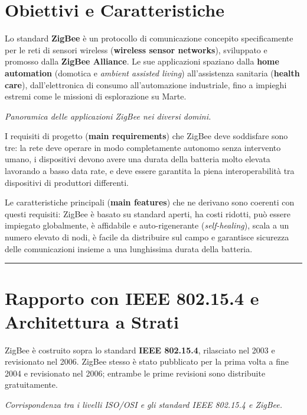 \documentclass[
  italian,
  openany]{book}
\begin{document}
\section{Obiettivi e Caratteristiche}\label{obiettivi-e-caratteristiche}

Lo standard \textbf{ZigBee} è un protocollo di comunicazione concepito
specificamente per le reti di sensori wireless (\textbf{wireless sensor
networks}), sviluppato e promosso dalla \textbf{ZigBee Alliance}. Le sue
applicazioni spaziano dalla \textbf{home automation} (domotica e
\emph{ambient assisted living}) all'assistenza sanitaria (\textbf{health
care}), dall'elettronica di consumo all'automazione industriale, fino a
impieghi estremi come le missioni di esplorazione su Marte.

\emph{Panoramica delle applicazioni ZigBee nei diversi domini.}

I requisiti di progetto (\textbf{main requirements}) che ZigBee deve
soddisfare sono tre: la rete deve operare in modo completamente autonomo
senza intervento umano, i dispositivi devono avere una durata della
batteria molto elevata lavorando a basso data rate, e deve essere
garantita la piena interoperabilità tra dispositivi di produttori
differenti.

Le caratteristiche principali (\textbf{main features}) che ne derivano
sono coerenti con questi requisiti: ZigBee è basato su standard aperti,
ha costi ridotti, può essere impiegato globalmente, è affidabile e
auto-rigenerante (\emph{self-healing}), scala a un numero elevato di
nodi, è facile da distribuire sul campo e garantisce sicurezza delle
comunicazioni insieme a una lunghissima durata della batteria.

\begin{center}\rule{0.5\linewidth}{0.5pt}\end{center}

\section{Rapporto con IEEE 802.15.4 e Architettura a
Strati}\label{rapporto-con-ieee-802.15.4-e-architettura-a-strati}

ZigBee è costruito sopra lo standard \textbf{IEEE 802.15.4}, rilasciato
nel 2003 e revisionato nel 2006. ZigBee stesso è stato pubblicato per la
prima volta a fine 2004 e revisionato nel 2006; entrambe le prime
revisioni sono distribuite gratuitamente.

\emph{Corrispondenza tra i livelli ISO/OSI e gli standard IEEE 802.15.4
e ZigBee.}
\end{document}
